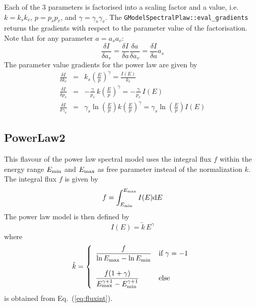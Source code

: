 \documentclass{article}[12pt,a4]
\begin{document}
Each of the 3 parameters is factorised into a scaling factor and a value, i.e.
$k=k_s k_v$, $p=p_s p_v$, and $\gamma = \gamma_s \gamma_v$.
The {\tt GModelSpectralPlaw::eval\_gradients} returns the gradients with
respect to the parameter value of the factorisation.
Note that for any parameter $a=a_s a_v$:
\begin{equation}
\frac{\delta I}{\delta a_v} = \frac{\delta I}{\delta a} \frac{\delta a}{\delta a_v} =
  \frac{\delta I}{\delta a} a_s
\end{equation}
The parameter value gradients for the power law are given by
\begin{eqnarray}
\frac{\delta I}{\delta k_v} & = & 
  k_s \left( \frac{E}{p} \right)^{\gamma} = \frac{I(E)}{k_v} \\
\frac{\delta I}{\delta p_v} & = & 
  -\frac{\gamma}{p_v} \, k \left( \frac{E}{p} \right)^{\gamma} =
  -\frac{\gamma}{p_v} \, I(E) \\
\frac{\delta I}{\delta \gamma_v} & = &
  \gamma_s \ln \left( \frac{E}{p} \right) k \left( \frac{E}{p} \right)^{\gamma} =
  \gamma_s \ln \left( \frac{E}{p} \right) I(E)
\end{eqnarray}


\subsection{PowerLaw2}

This flavour of the power law spectral model uses the integral flux $f$ within the
energy range $E_{\rm min}$ and $E_{\rm max}$ as free parameter instead of
the normalization $k$.
The integral flux $f$ is given by
\begin{equation}
f = \int_{E_{\rm min}}^{E_{\rm max}} I(E) {\rm d}E
\label{eq:fluxint}
\end{equation}
The power law model is then defined by
\begin{equation}
I(E) = \tilde{k} \, E^{\gamma}
\end{equation}
where
\begin{equation}
   \tilde{k} = \left \{
   \begin{array}{l l}
      \displaystyle
      \frac{f}{\ln E_{\rm max} - \ln E_{\rm min}} 
        & \mbox{if $\gamma = -1$} \\
     \\
     \displaystyle
      \frac{f (1+\gamma)}{E_{\rm max}^{\gamma+1}-E_{\rm min}^{\gamma+1}} 
        & \mbox{else}
   \end{array}
   \right .
\end{equation}
is obtained from Eq.~(\ref{eq:fluxint}).
\end{document}
